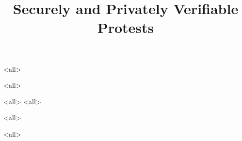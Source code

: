 \title{%
  Securely and Privately Verifiable Protests
}

\maketitle

\mode*

\begin{abstract}
  
\end{abstract}

\clearpage
\tableofcontents
\clearpage

\mode<all>


\mode<all>


\mode<all>
%
\mode<all>
%

\mode<all>

\mode<all>




\begin{frame}[allowframebreaks]
  \printbibliography{}
\end{frame}
